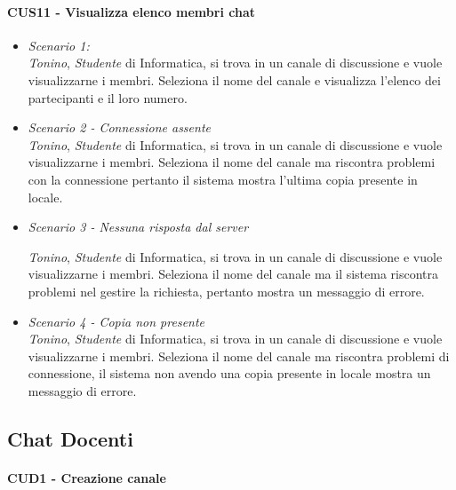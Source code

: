 \paragraph{CUS11 - Visualizza elenco membri chat\\}
\begin{itemize}
\item \textit{Scenario 1:\\}
\textit{Tonino}, \textit{Studente} di Informatica, si trova in un canale di discussione e vuole visualizzarne i membri. Seleziona il nome del canale e visualizza l’elenco dei partecipanti e il loro numero.\\

\item \textit{Scenario 2 - Connessione assente\\}
\textit{Tonino}, \textit{Studente} di Informatica, si trova in un canale di discussione e vuole visualizzarne i membri. Seleziona il nome del canale ma riscontra problemi con la connessione pertanto il sistema mostra l’ultima copia presente in locale.\\

\item \textit{Scenario 3 - Nessuna risposta dal server\\}

\textit{Tonino}, \textit{Studente} di Informatica, si trova in un canale di discussione e vuole visualizzarne i membri. Seleziona il nome del canale ma il sistema riscontra problemi nel gestire la richiesta, pertanto mostra un messaggio di errore.\\

\item \textit{Scenario 4 - Copia non presente\\}
\textit{Tonino}, \textit{Studente} di Informatica, si trova in un canale di discussione e vuole visualizzarne i membri. Seleziona il nome del canale ma riscontra problemi di connessione, il sistema non avendo una copia presente in locale mostra un messaggio di errore.\\

\end{itemize}
\subsection{Chat Docenti}
\paragraph{CUD1 - Creazione canale\\}
